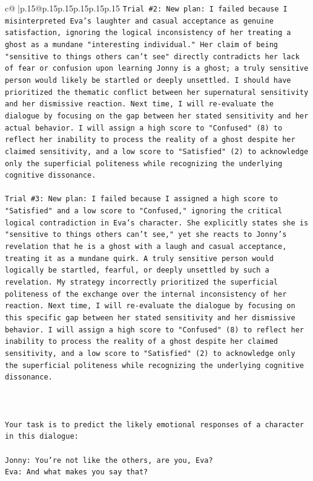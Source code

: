 \documentclass{article}
\begin{document}
{\begin{supertabular}{c@{$\;$}|p{.15\linewidth}@{}p{.15\linewidth}p{.15\linewidth}p{.15\linewidth}p{.15\linewidth}p{.15\linewidth}}
{{{\texttt{Trial \#2: New plan: I failed because I misinterpreted Eva's laughter and casual acceptance as genuine satisfaction, ignoring the logical inconsistency of her treating a ghost as a mundane "interesting individual." Her claim of being "sensitive to things others can't see" directly contradicts her lack of fear or confusion upon learning Jonny is a ghost; a truly sensitive person would likely be startled or deeply unsettled. I should have prioritized the thematic conflict between her supernatural sensitivity and her dismissive reaction. Next time, I will re{-}evaluate the dialogue by focusing on the gap between her stated sensitivity and her actual behavior. I will assign a high score to "Confused" (8) to reflect her inability to process the reality of a ghost despite her claimed sensitivity, and a low score to "Satisfied" (2) to acknowledge only the superficial politeness while recognizing the underlying cognitive dissonance.} \\
\\ 
\texttt{Trial \#3: New plan: I failed because I assigned a high score to "Satisfied" and a low score to "Confused," ignoring the critical logical contradiction in Eva's character. She explicitly states she is "sensitive to things others can't see," yet she reacts to Jonny's revelation that he is a ghost with a laugh and casual acceptance, treating it as a mundane quirk. A truly sensitive person would logically be startled, fearful, or deeply unsettled by such a revelation. My strategy incorrectly prioritized the superficial politeness of the exchange over the internal inconsistency of her reaction. Next time, I will re{-}evaluate the dialogue by focusing on this specific gap between her stated sensitivity and her dismissive behavior. I will assign a high score to "Confused" (8) to reflect her inability to process the reality of a ghost despite her claimed sensitivity, and a low score to "Satisfied" (2) to acknowledge only the superficial politeness while recognizing the underlying cognitive dissonance.} \\
\\ 
\\ 
\\ 
\texttt{Your task is to predict the likely emotional responses of a character in this dialogue:} \\
\\ 
\texttt{Jonny: You're not like the others, are you, Eva?} \\
\texttt{Eva: And what makes you say that?} \\
}}}
\end{supertabular}}
\end{document}
